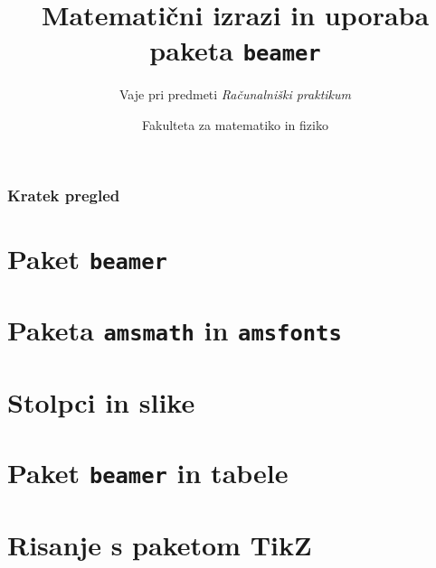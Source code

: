 \documentclass{beamer}
\begin{document}
\title{Matematični izrazi in uporaba paketa \texttt{beamer}}
\subtitle{Vaje pri predmeti \emph{Računalniški praktikum}}
\author{Fakulteta za matematiko in fiziko}
\date{}
\maketitle
\begin{frame}
\frametitle{Kratek pregled}
\tableofcontents %
\end{frame}



\section{Paket \texttt{beamer}}


\section{Paketa \texttt{amsmath} in \texttt{amsfonts}}

\section{Stolpci in slike}

\section{Paket \texttt{beamer} in tabele}

\section{Risanje s paketom TikZ}
\end{document}
